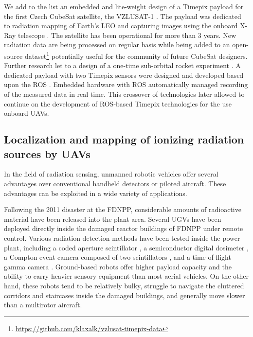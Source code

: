 \documentclass[a4paper,11pt,titlepage,twoside]{book}
\begin{document}
We add to the list an embedded and lite-weight design of a Timepix payload for the first Czech CubeSat satellite, the VZLUSAT-1 \cite{urban2017vzlusat, daniel2019inorbit}.
The payload was dedicated to radiation mapping of Earth's \ac{LEO} \cite{baca2018timepix} and capturing images using the onboard X-Ray telescope \cite{baca2016miniaturized}.
The satellite has been operational for more than 3 years.
New radiation data are being processed on regular basis while being added to an open-source dataset\footnote{\url{https://github.com/klaxalk/vzlusat-timepix-data}} potentially useful for the community of future CubeSat designers.
Further research let to a design of a one-time sub-orbital rocket experiment \cite{daniel2017xray, urban2020rex}.
A dedicated payload with two Timepix sensors were designed and developed based upon the \acl{ROS} \cite{baca2018rospix}.
Embedded hardware with \ac{ROS} automatically managed recording of the measured data in real time.
This crossover of technologies later allowed to continue on the development of \ac{ROS}-based Timepix technologies for the use onboard \aclp{UAV}.



\subsection{Localization and mapping of ionizing radiation sources by \acp{UAV}}

In the field of radiation sensing, unmanned robotic vehicles offer several advantages over conventional handheld detectors or piloted aircraft.
These advantages can be exploited in a wide variety of applications.

Following the 2011 disaster at the \ac{FDNPP}, considerable amounts of radioactive material have been released into the plant area.
Several \acp{UGV} have been deployed directly inside the damaged reactor buildings of \ac{FDNPP} under remote control.
Various radiation detection methods have been tested inside the power plant, including a coded aperture scintillator \cite{ohno2011robotic}, a semiconductor digital dosimeter \cite{nagatani2013emergency}, a Compton event camera composed of two scintillators \cite{sato2019radiation}, and a time-of-flight gamma camera \cite{kinoshita2014development}.
Ground-based robots offer higher payload capacity and the ability to carry heavier sensory equipment than most aerial vehicles.
On the other hand, these robots tend to be relatively bulky, struggle to navigate the cluttered corridors and staircases inside the damaged buildings, and generally move slower than a multirotor aircraft.
\end{document}
